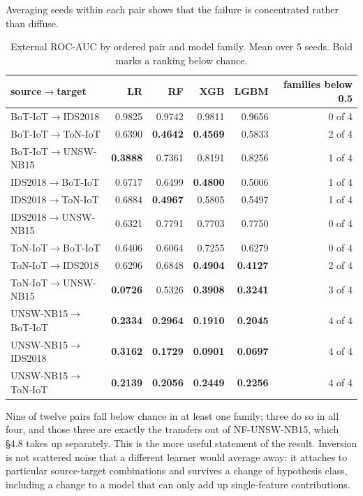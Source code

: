 \documentclass[11pt,a4paper]{article}
\begin{document}
Averaging seeds within each pair shows that the failure is concentrated rather than diffuse.

\begin{table}[htbp]\centering\small
\caption{External ROC-AUC by ordered pair and model family. Mean over 5 seeds. Bold marks a ranking below chance.}
\begin{tabular}{lrrrrr}
\toprule
source$\rightarrow$target & LR & RF & XGB & LGBM & families below 0.5 \\
\midrule
BoT-IoT$\rightarrow$IDS2018 & 0.9825 & 0.9742 & 0.9811 & 0.9656 & 0 of 4 \\
BoT-IoT$\rightarrow$ToN-IoT & 0.6390 & \textbf{0.4642} & \textbf{0.4569} & 0.5833 & 2 of 4 \\
BoT-IoT$\rightarrow$UNSW-NB15 & \textbf{0.3888} & 0.7361 & 0.8191 & 0.8256 & 1 of 4 \\
IDS2018$\rightarrow$BoT-IoT & 0.6717 & 0.6499 & \textbf{0.4800} & 0.5006 & 1 of 4 \\
IDS2018$\rightarrow$ToN-IoT & 0.6884 & \textbf{0.4967} & 0.5805 & 0.5497 & 1 of 4 \\
IDS2018$\rightarrow$UNSW-NB15 & 0.6321 & 0.7791 & 0.7703 & 0.7750 & 0 of 4 \\
ToN-IoT$\rightarrow$BoT-IoT & 0.6406 & 0.6064 & 0.7255 & 0.6279 & 0 of 4 \\
ToN-IoT$\rightarrow$IDS2018 & 0.6296 & 0.6848 & \textbf{0.4904} & \textbf{0.4127} & 2 of 4 \\
ToN-IoT$\rightarrow$UNSW-NB15 & \textbf{0.0726} & 0.5326 & \textbf{0.3908} & \textbf{0.3241} & 3 of 4 \\
UNSW-NB15$\rightarrow$BoT-IoT & \textbf{0.2334} & \textbf{0.2964} & \textbf{0.1910} & \textbf{0.2045} & 4 of 4 \\
UNSW-NB15$\rightarrow$IDS2018 & \textbf{0.3162} & \textbf{0.1729} & \textbf{0.0901} & \textbf{0.0697} & 4 of 4 \\
UNSW-NB15$\rightarrow$ToN-IoT & \textbf{0.2139} & \textbf{0.2056} & \textbf{0.2449} & \textbf{0.2256} & 4 of 4 \\
\bottomrule
\end{tabular}
\end{table}

Nine of twelve pairs fall below chance in at least one family; three do so in all four, and those three are exactly the transfers out of NF-UNSW-NB15, which §4.8 takes up separately. This is the more useful statement of the result. Inversion is not scattered noise that a different learner would average away: it attaches to particular source-target combinations and survives a change of hypothesis class, including a change to a model that can only add up single-feature contributions.
\end{document}
